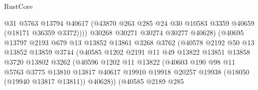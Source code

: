 \begin{lexlean}{RustCore}
\begin{coremodule}
                                @31
                                @5763
                                @13794
                                @40617
                                (@43870
                                  @263
                                  @285
                                  @24
                                  @30
                                  @10583
                                  @3359
                                  @40659
                                  (@18171 @36359 @3372))))
                            @30268
                            @30271
                            @30274
                            @30277
                            @40628)
                          (@40695
                            @13797
                            @2193
                            @679
                            @13
                            @13852
                            @13861
                            @3268
                            @3762
                            (@40578
                              @2192
                              @50
                              @13
                              @13852
                              @13859
                              @3744
                              (@40585
                                @1202
                                @2191
                                @11
                                @49
                                @13822
                                @13851
                                @13858
                                @3720
                                @13802
                                @3262
                                (@40596
                                  @1202
                                  @11
                                  @13822
                                  (@40603
                                    @190
                                    @98
                                    @11
                                    @5763
                                    @3775
                                    @13810
                                    @13817
                                    @40617
                                    @19910
                                    @19918
                                    @20257
                                    @19938
                                    (@18050 (@19940 @13817 @13811))
                                    @40628))
                                (@40585
                                  @2189
                                  @285

\end{coremodule}
\end{lexlean}
